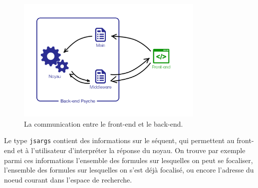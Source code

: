 \begin{figure}[!ht]
    \center
    \includegraphics[width=0.8\textwidth]{./images/II_2_communication.png}
    \caption{\label{communication} La communication entre le front-end et le back-end.}
\end{figure}

Le type \texttt{jsargs} contient des informations sur le séquent, qui permettent au front-end et à l'utilisateur d'interpréter la réponse du noyau. On trouve par exemple parmi ces informations l'ensemble des formules sur lesquelles on peut se focaliser, l'ensemble des formules sur lesquelles on s'est déjà focalisé, ou encore l'adresse du noeud courant dans l'espace de recherche.